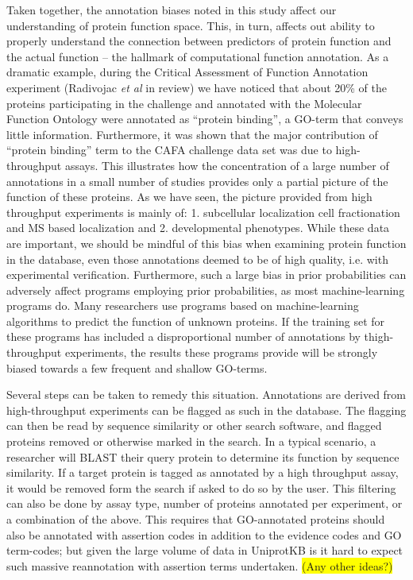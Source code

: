\documentclass[12pt]{article}
\newcommand{\hilite}[1]{\colorbox{yellow}{#1}}
\begin{document}
Taken together, the annotation biases noted in this study affect our understanding of
protein function space. This, in turn, affects out ability to properly understand the
connection between predictors of protein function and the actual function -- the hallmark
of computational function annotation. As a dramatic example, during the Critical Assessment
of Function Annotation experiment (Radivojac \textit{et al} in review) we have noticed that
about 20\% of the proteins participating in the challenge and annotated with the Molecular
Function Ontology were annotated as ``protein binding'', a GO-term that conveys little
information. Furthermore, it was shown that the major contribution of ``protein binding''
term to the CAFA challenge data set was due to high-throughput assays. This illustrates how
the concentration of a large number of annotations in a small number of studies provides
only a partial picture of the function of these proteins. As we have seen, the picture
provided from high throughput experiments is mainly of: 1. subcellular localization cell
fractionation and MS based localization and 2. developmental phenotypes. While these data
are important, we should be mindful of this bias when examining protein function in the
database, even those annotations deemed to be of high quality, i.e. with experimental
verification. Furthermore, such a large bias in prior probabilities can adversely affect
programs employing prior probabilities, as most machine-learning programs do. Many
researchers use programs based on machine-learning algorithms to predict the function of
unknown proteins. If the training set for these programs has included a disproportional
number of annotations by thigh-throughput experiments, the results these programs provide
will be strongly biased towards a few frequent and shallow GO-terms.

Several steps can be taken to remedy this situation. Annotations are derived from
high-throughput experiments can be flagged as such in the database. The flagging can then be
read by sequence similarity or other search software, and flagged proteins removed or
otherwise marked in the search.  In a typical scenario, a researcher will BLAST their query
protein to determine its function by sequence similarity. If a target protein is tagged as
annotated by a high throughput assay, it would be removed form the search if asked to do so
by the user. This filtering can also be done by assay type, number of proteins annotated per
experiment, or a combination of the above. This requires that GO-annotated proteins should
also be annotated with assertion codes in addition to the evidence codes and GO term-codes;
but given the large volume of data in UniprotKB is it hard to expect such massive
reannotation with assertion terms undertaken. \hilite{(Any other ideas?)}
\end{document}
